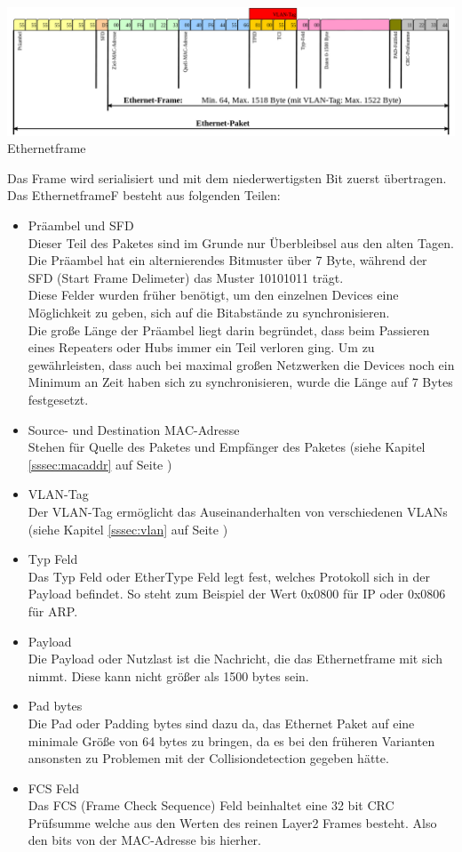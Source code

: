 \documentclass[12pt,a4paper]{report}
\begin{document}
\begin{onehalfspace}
\begin{center}
\includegraphics[scale=0.35]{../docs/tarkes/pics/Ethernetpaket.png}
Ethernetframe
\end{center}

Das Frame wird serialisiert und mit dem niederwertigsten Bit zuerst übertragen. Das EthernetframeF besteht aus folgenden Teilen:
\begin{itemize}
\item Präambel und SFD\\
Dieser Teil des Paketes sind im Grunde nur Überbleibsel aus den alten Tagen. Die Präambel hat ein alternierendes Bitmuster über 7 Byte, während der SFD (Start Frame Delimeter) das Muster 10101011 trägt.\\
Diese Felder wurden früher benötigt, um den einzelnen Devices eine Möglichkeit zu geben, sich auf die Bitabstände zu synchronisieren.\\
Die große Länge der Präambel liegt darin begründet, dass beim Passieren eines Repeaters oder Hubs immer ein Teil verloren ging. Um zu gewährleisten, dass auch bei maximal großen Netzwerken die Devices noch ein Minimum an Zeit haben sich zu synchronisieren, wurde die Länge auf 7 Bytes festgesetzt. 
\item Source- und Destination MAC-Adresse\\
Stehen für Quelle des Paketes und Empfänger des Paketes (siehe Kapitel \ref{sssec:macaddr} auf Seite \pageref{sssec:macaddr})
\item VLAN-Tag\\
Der VLAN-Tag ermöglicht das Auseinanderhalten von verschiedenen VLANs (siehe Kapitel \ref{sssec:vlan} auf Seite \pageref{sssec:vlan})
\item Typ Feld\\
Das Typ Feld oder EtherType Feld legt fest, welches Protokoll sich in der Payload befindet. So steht zum Beispiel der Wert 0x0800 für IP oder 0x0806 für ARP.
\item Payload\\
Die Payload oder Nutzlast ist die Nachricht, die das Ethernetframe mit sich nimmt. Diese kann nicht größer als 1500 bytes sein.
\item Pad bytes\\
Die Pad oder Padding bytes sind dazu da, das Ethernet Paket auf eine minimale Größe von 64 bytes zu bringen, da es bei den früheren Varianten ansonsten zu Problemen mit der Collisiondetection gegeben hätte.
\item FCS Feld\\
Das FCS (Frame Check Sequence) Feld beinhaltet eine 32 bit CRC Prüfsumme welche aus den Werten des reinen Layer2 Frames besteht. Also den bits von der MAC-Adresse bis hierher.
\end{itemize}


\end{onehalfspace}
\end{document}
